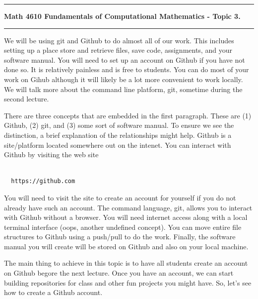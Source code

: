 \documentclass[10pt,fleqn]{article}
\begin{document}
\vskip0.1in\hrule\vskip0.1in
\noindent
{\bf Math 4610 Fundamentals of Computational Mathematics  - Topic 3.} 
\vskip0.1in\hrule\vskip0.1in
\noindent
We will be using git and Github to do almost all of our work. This includes
setting up a place store and retrieve files, save code, assignments, and your
software manual. You will need to set up an account on Github if you have not
done so. It is relatively painless and is free to students. You can do most of
your work on Gihub although it will likely be a lot more convenient to work
locally. We will talk more about the command line platform, git, sometime
during the second lecture.

\noindent
There are three concepts that are embedded in the first paragraph. These are
(1) Github, (2) git, and (3) some sort of software manual. To ensure we see
the distinction, a brief explanation of the relationships might help. Github
is a site/platform located somewhere out on the intenet. You can interact with
Github by visiting the web site
\begin{verbatim}

  https://github.com

\end{verbatim}
You will need to visit the site to create an account for yourself if you do not
already have such an account. The command language, git, allows you to interact
with Github without a browser. You will need internet access along with a local
terminal interface (oops, another undefined concept). You can move entire file
structures to Github using a push/pull to do the work. Finally, the software
manual you will create will be stored on Github and also on your local machine.

The main thing to achieve in this topic is to have all students create an 
account on Github begore the next lecture. Once you have an account, we can
start building repositories for class and other fun projects you might have. So,
let's see how to create a Github account.
\end{document}
